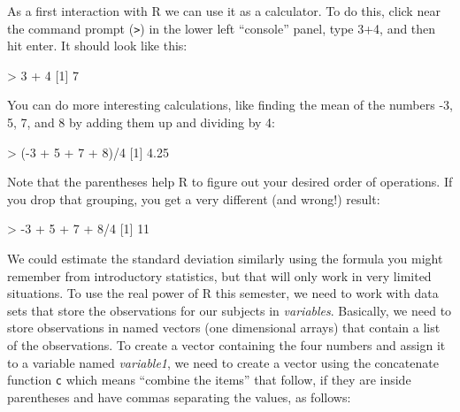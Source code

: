 \documentclass[
]{book}
\newenvironment{Shaded}{\begin{snugshade}}{\end{snugshade}}
\newcommand{\DecValTok}[1]{\textcolor[rgb]{0.00,0.00,0.81}{#1}}
\newcommand{\FloatTok}[1]{\textcolor[rgb]{0.00,0.00,0.81}{#1}}
\newcommand{\NormalTok}[1]{#1}
\newcommand{\SpecialCharTok}[1]{\textcolor[rgb]{0.00,0.00,0.00}{#1}}
\begin{document}
\indent As a first interaction with R we can use it as a calculator. To do this, click near the command prompt
(\texttt{\textgreater{}}) in the lower left ``console'' panel, type 3+4, and then hit enter. It
should look like this:

\begin{Shaded}
\begin{Highlighting}[]
\SpecialCharTok{\textgreater{}} \DecValTok{3} \SpecialCharTok{+} \DecValTok{4}
\NormalTok{[}\DecValTok{1}\NormalTok{] }\DecValTok{7}
\end{Highlighting}
\end{Shaded}

You can do more interesting calculations, like finding the mean of the
numbers -3, 5, 7, and 8 by adding them up and dividing by 4:

\begin{Shaded}
\begin{Highlighting}[]
\SpecialCharTok{\textgreater{}}\NormalTok{ (}\SpecialCharTok{{-}}\DecValTok{3} \SpecialCharTok{+} \DecValTok{5} \SpecialCharTok{+} \DecValTok{7} \SpecialCharTok{+} \DecValTok{8}\NormalTok{)}\SpecialCharTok{/}\DecValTok{4}
\NormalTok{[}\DecValTok{1}\NormalTok{] }\FloatTok{4.25}
\end{Highlighting}
\end{Shaded}

Note that the parentheses help R to figure out your desired order of operations. If you drop that grouping, you get
a very different (and wrong!) result:

\begin{Shaded}
\begin{Highlighting}[]
\SpecialCharTok{\textgreater{}} \SpecialCharTok{{-}}\DecValTok{3} \SpecialCharTok{+} \DecValTok{5} \SpecialCharTok{+} \DecValTok{7} \SpecialCharTok{+} \DecValTok{8}\SpecialCharTok{/}\DecValTok{4}
\NormalTok{[}\DecValTok{1}\NormalTok{] }\DecValTok{11}
\end{Highlighting}
\end{Shaded}

We could estimate the standard deviation similarly using the formula you might remember from introductory
statistics, but that will only work in very limited situations. To use the real
power of R this semester, we need to work with data sets that store the
observations for our subjects in \emph{variables}.
Basically, we need to store observations in named vectors (one dimensional
arrays) that contain a list of the observations. To create a vector containing
the four numbers and assign it to a variable named \emph{variable1}, we need to
create a vector using the concatenate function
\texttt{c} which means ``combine the items'' that follow, if they are inside
parentheses and have commas separating the values,
as follows:
\end{document}
